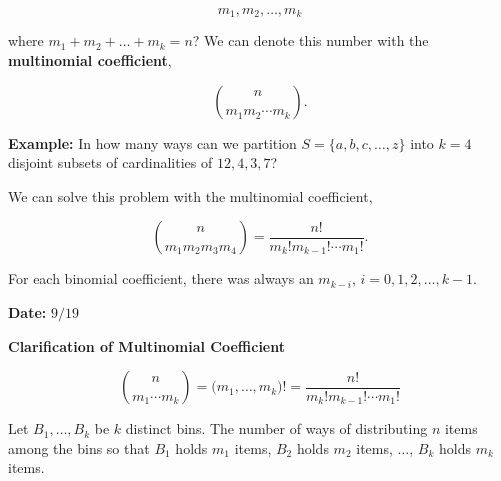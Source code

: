 \documentclass[12pt]{article}
\begin{document}
\begin{equation*}
m_1, m_2, \ldots, m_k
\end{equation*}

\noindent
where $m_1 + m_2 + \ldots + m_k = n$? We can denote this number with the \textbf{multinomial coefficient},

\begin{equation*}
{n \choose m_1m_2 \cdots m_k}.
\end{equation*}

\begin{tcolorbox}
\textbf{Example:} In how many ways can we partition $S = \{ a,b,c, \ldots, z \}$ into $k=4$ disjoint subsets of cardinalities of $12, 4, 3, 7$?

\noindent
We can solve this problem with the multinomial coefficient, 

\begin{equation*}
{n \choose m_1m_2m_3m_4} = \frac{n!}{m_k! m_{k-1}! \cdots m_{1}!}.
\end{equation*}

\noindent
For each binomial coefficient, there was always an $m_{k-i}$, $i=0,1,2, \ldots, k-1$.
\end{tcolorbox}


\begin{flushright}
\textbf{Date:} $9/19$
\end{flushright}


\noindent
\textbf{Clarification of Multinomial Coefficient}

\begin{equation*}
{n \choose m_1 \cdots m_k} = \big ( m_1, \ldots, m_k \big )! = \frac{n!}{m_k! m_{k-1}! \cdots m_{1}!}
\end{equation*}

\noindent
Let $B_1, \ldots, B_k$ be $k$ distinct bins. The number of ways of distributing $n$ items among the bins so that $B_1$ holds $m_1$ items, $B_2$ holds $m_2$ items, $\ldots$, $B_k$ holds $m_k$ items. 
\end{document}
